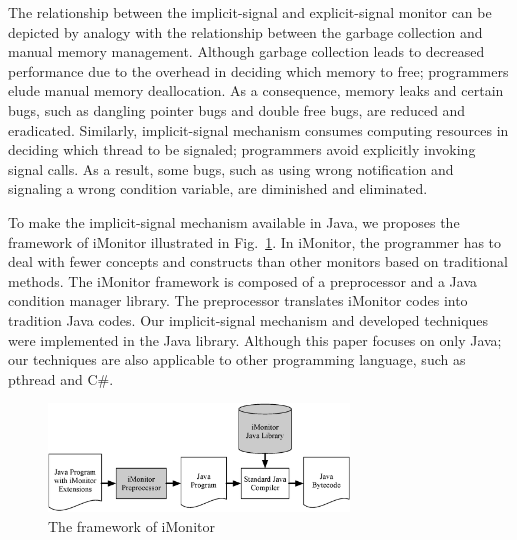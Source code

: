 \documentclass[preprint]{sigplanconf}
\begin{document}
The relationship between the implicit-signal and explicit-signal monitor can be 
depicted by analogy with the relationship between the garbage collection and 
manual memory management. Although garbage collection leads to decreased
performance due to the overhead in deciding which memory to free; programmers 
elude manual memory deallocation. As a consequence, memory leaks and certain 
bugs, such as dangling pointer bugs and double free bugs, are reduced and 
eradicated. Similarly, implicit-signal mechanism consumes computing resources 
in deciding which thread to be signaled; programmers avoid explicitly invoking 
signal calls. As a result, some bugs, such as using wrong notification and
signaling a wrong condition variable, are diminished and eliminated. 

To make the implicit-signal mechanism available in Java, we proposes the 
framework of iMonitor illustrated in Fig.~\ref{fig:fw}. In iMonitor, the 
programmer has to deal with fewer concepts and constructs than other monitors 
based on traditional methods. The iMonitor framework is composed of a 
preprocessor and a Java condition manager library. The preprocessor translates 
iMonitor codes into tradition Java codes. Our implicit-signal mechanism and 
developed techniques were implemented in the Java library. Although this paper 
focuses on only Java; our techniques are also applicable to other programming 
language, such as pthread and C\#.  

%
\begin{figure}[ht!]
  \centering
  \includegraphics[width=80mm]{fig/flow.eps}
  \caption{The framework of iMonitor}
  \label{fig:fw}
\end{figure}
\end{document}
